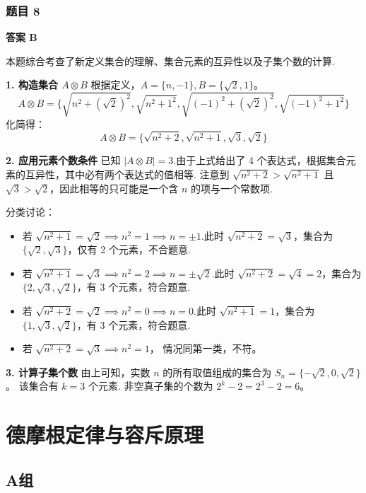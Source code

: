 \subsubsection*{题目 8}
\begin{solution}
	\textbf{答案 B}
	
	本题综合考查了新定义集合的理解、集合元素的互异性以及子集个数的计算.
	
	\textbf{1. 构造集合 $A \otimes B$}
	根据定义，$A=\{n, -1\}, B=\{\sqrt{2}, 1\}$。
	\[ A \otimes B = \{\sqrt{n^2 + (\sqrt{2})^2}, \sqrt{n^2 + 1^2}, \sqrt{(-1)^2 + (\sqrt{2})^2}, \sqrt{(-1)^2 + 1^2}\} \]
	化简得：
	\[ A \otimes B = \{\sqrt{n^2+2}, \sqrt{n^2+1}, \sqrt{3}, \sqrt{2}\} \]
	
	\textbf{2. 应用元素个数条件}
	已知 $|A \otimes B| = 3$.由于上式给出了 4 个表达式，根据集合元素的互异性，其中必有两个表达式的值相等.
	注意到 $\sqrt{n^2+2} > \sqrt{n^2+1}$ 且 $\sqrt{3} > \sqrt{2}$，因此相等的只可能是一个含 $n$ 的项与一个常数项.
	
	分类讨论：
	\begin{itemize}
		\item 若 $\sqrt{n^2+1} = \sqrt{2} \implies n^2=1 \implies n=\pm 1$.此时 $\sqrt{n^2+2}=\sqrt{3}$，集合为 $\{\sqrt{2}, \sqrt{3}\}$，仅有 2 个元素，不合题意.
		\item 若 $\sqrt{n^2+1} = \sqrt{3} \implies n^2=2 \implies n=\pm \sqrt{2}$.此时 $\sqrt{n^2+2}=\sqrt{4}=2$，集合为 $\{2, \sqrt{3}, \sqrt{2}\}$，有 3 个元素，符合题意.
		\item 若 $\sqrt{n^2+2} = \sqrt{2} \implies n^2=0 \implies n=0$.此时 $\sqrt{n^2+1}=1$，集合为 $\{1, \sqrt{3}, \sqrt{2}\}$，有 3 个元素，符合题意.
		\item 若 $\sqrt{n^2+2} = \sqrt{3} \implies n^2=1$， 情况同第一类，不符。
	\end{itemize}
	
	\textbf{3. 计算子集个数}
	由上可知，实数 $n$ 的所有取值组成的集合为 $S_n = \{-\sqrt{2}, 0, \sqrt{2}\}$。
	该集合有 $k=3$ 个元素.
	非空真子集的个数为 $2^k - 2 = 2^3 - 2 = 6$。
\end{solution}

\section{德摩根定律与容斥原理}

\subsection*{A组}


